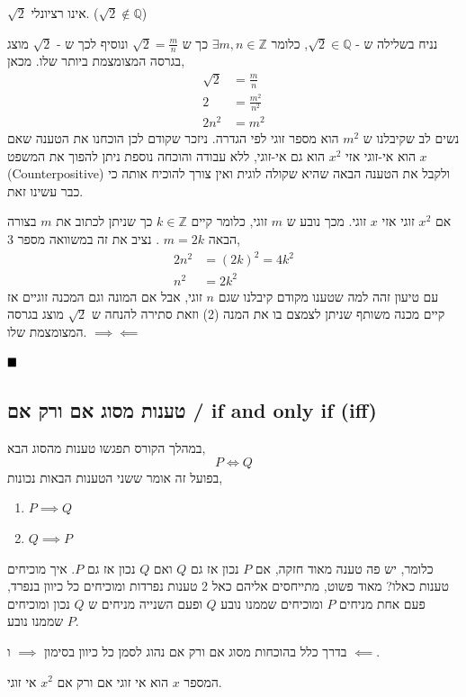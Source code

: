 \documentclass[a4paper,12pt]{article}
\renewcommand{\qed}{\hfill\blacksquare}
\newcommand{\te}[1]{\textenglish{#1}}
\begin{document}
\begin{RTL}
\begin{theorem*}
$\sqrt{2}$ אינו רציונלי. ($\sqrt{2} \notin \mathbb{Q}$)
\end{theorem*}

\begin{Proof}
נניח בשלילה ש - $\sqrt{2} \in \mathbb{Q}$, כלומר $\exists m,n \in \mathbb{Z}$ כך ש $\sqrt{2} = \frac{m}{n}$ ונוסיף לכך ש - $\sqrt{2}$ מוצג בגרסה המצומצמת ביותר שלו. מכאן,
\begin{align}
\sqrt{2} &= \frac{m}{n}  \\
2 &= \frac{m^2}{n^2}  \\
2n^2 &= m^2 
\end{align}
נשים לב שקיבלנו ש $m^2$ הוא מספר זוגי לפי הגדרה. ניזכר שקודם לכן הוכחנו את הטענה שאם $x$ הוא אי-זוגי אזי $x^2$ הוא גם אי-זוגי, ללא עבודה והוכחה נוספת ניתן להפוך את המשפט (\te{Counterpositive}) ולקבל את הטענה הבאה שהיא שקולה לוגית ואין צורך להוכיח אותה כי כבר עשינו זאת.

אם $x^2$ זוגי אזי $x$ זוגי.
מכך נובע ש $m$ זוגי, כלומר קיים $k \in \mathbb{Z}$ כך שניתן לכתוב את $m$ בצורה הבאה $m = 2k$ . נציב את זה במשוואה מספר 3,
\begin{align}
2n^2 &= (2k)^2 = 4k^2 \\
n^2 &= 2k^2
\end{align}
עם טיעון זהה למה שטענו מקודם קיבלנו שגם $n$ זוגי, אבל אם המונה וגם המכנה זוגיים אז קיים מכנה משותף שניתן לצמצם בו את המנה (2) וזאת סתירה להנחה ש $\sqrt{2}$ מוצג בגרסה המצומצמת שלו. $\implies \impliedby$ 

$\qed$
\end{Proof}


\subsection{טענות מסוג אם ורק אם / \te{if and only if (iff)}}
במהלך הקורס תפגשו טענות מהסוג הבא,
$$
P \iff Q
$$
בפועל זה אומר ששני הטענות הבאות נכונות,
\begin{enumerate}
  \item $P \implies Q$
  \item $Q \implies P$
\end{enumerate}
כלומר, יש פה טענה מאוד חזקה, אם $P$ נכון אז גם $Q$ ואם $Q$ נכון אז גם $P$.
איך מוכיחים טענות כאלו? מאוד פשוט, מתייחסים אליהם כאל 2 טענות נפרדות ומוכיחים כל כיוון בנפרד, פעם אחת מניחים $P$ ומוכיחים שממנו נובע $Q$ ופעם השנייה מניחים ש $Q$ נכון ומוכיחים שממנו נובע $P$.

\begin{remark}
  בדרך כלל בהוכחות מסוג אם ורק אם נהוג לסמן כל כיוון בסימון $\implies$ ו $\impliedby$.
\end{remark}
\begin{theorem*}
  המספר $x$ הוא אי זוגי אם ורק אם $x^2$ אי זוגי.
\end{theorem*}


\end{RTL}
\end{document}
